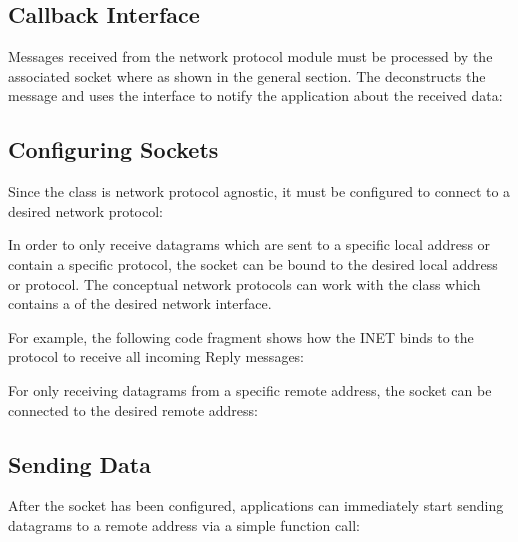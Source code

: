 \subsection*{Callback Interface}

Messages received from the network protocol module must be processed by the
associated socket where as shown in the general section. The 
deconstructs the message and uses the  interface
to notify the application about the received data:


\subsection*{Configuring Sockets}

Since the  class is network protocol agnostic, it must be
configured to connect to a desired network protocol:


In order to only receive datagrams which are sent to a specific local address or
contain a specific protocol, the socket can be bound to the desired local
address or protocol. The conceptual network protocols can work with the
 class which contains a  of the desired
network interface.

For example, the following code fragment shows how the INET 
binds to the  protocol to receive all incoming 
Reply messages:


For only receiving datagrams from a specific remote address, the socket can be
connected to the desired remote address:


\subsection*{Sending Data}

After the socket has been configured, applications can immediately start sending
datagrams to a remote address via a simple function call:


